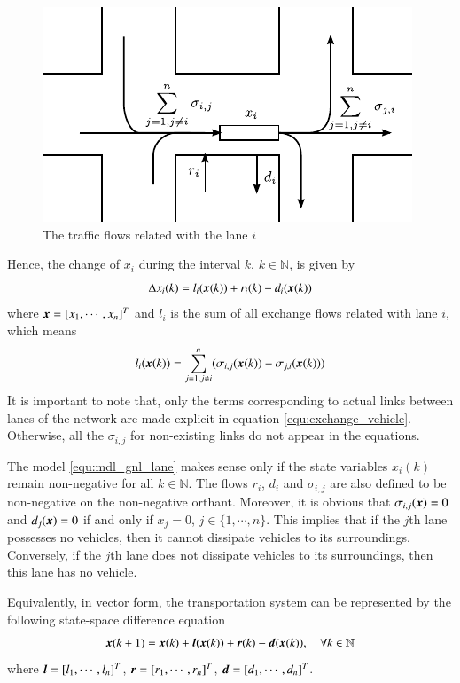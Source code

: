 \documentclass[preprint,authoryear,12pt]{elsarticle}
\renewcommand{\vec}[1]{\mbox{\boldmath$#1$}}
\begin{document}
\begin{figure}[ht]
  \centering
  \includegraphics{pics/flows}
  \caption{The traffic flows related with the lane $i$}
  \label{fig:flows}
\end{figure}

Hence, the change of $x_i$ during the interval
$k$, $k\in\mathbb{N}$, is given by
\begin{equation}\label{equ:mdl_gnl_lane}
\Delta x_i(k) = l_i(\vec{x}(k))+r_i(k)-d_i(\vec{x}(k))
\end{equation}
where $\vec{x}=[x_1,\cdots,x_n]^T$ and $l_i$ is the sum of all exchange flows related with lane $i$,
which means
\begin{equation}\label{equ:exchange_vehicle}
 l_i(\vec{x}(k))=\sum_{j=1,j\neq i}^{n}(\sigma_{i,j}(\vec{x}(k))-\sigma_{j,i}(\vec{x}(k)))
\end{equation}
It is important to note that, only the terms corresponding to actual
links between lanes  of the network are made explicit in  equation
\eqref{equ:exchange_vehicle}. Otherwise, all the $\sigma_{i,j}$ for
non-existing links do not appear in the equations.


The model \eqref{equ:mdl_gnl_lane} makes sense only if the state
variables $x_i(k)$ remain non-negative for all $k\in \mathbb{N}$. The
flows $r_i$, $d_{i}$ and $\sigma_{i,j}$ are also defined
to be non-negative on the non-negative orthant. Moreover, it is
obvious that  $\sigma_{i,j}(\vec{x})=0$ and $d_{j}(\vec{x})=0$ if and only if
$x_j=0$, $j\in\{1,\cdots,n\}$. This implies that if the $j$th lane
possesses no vehicles, then it cannot dissipate vehicles to its
surroundings. Conversely, if the $j$th lane does not dissipate
vehicles to its surroundings, then this lane has no vehicle.

Equivalently, in vector form, the transportation system can be
represented by the following state-space difference equation
\begin{equation}\label{equ:mdl_gnl}
\vec{x}(k+1)=\vec{x}(k)+\vec{l}(\vec{x}(k))+\vec{r}(k)-\vec{d}(\vec{x}(k)),\quad \forall k\in\mathbb{N}
\end{equation}
where $\vec{l}=[l_1,\cdots,l_n]^T$,
$\vec{r}=[r_1,\cdots,r_n]^T$, $\vec{d}=[d_1,\cdots,d_n]^T$.
\end{document}
